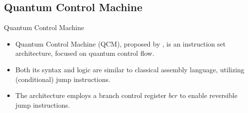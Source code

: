 \subsection{Quantum Control Machine}
\begin{frame}{Quantum Control Machine}
    \begin{itemize}
        \item Quantum Control Machine (QCM), proposed by \cite{YVC24}, is an instruction set architecture, focused on quantum control flow.
        \item Both its syntax and logic are similar to classical assembly language, utilizing (conditional) jump instructions.
        \item The architecture employs a branch control register $bcr$ to enable reversible jump instructions.
    \end{itemize}
\end{frame}


